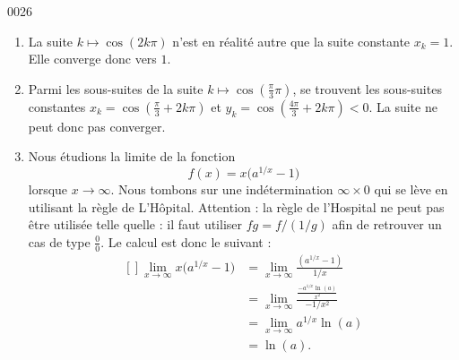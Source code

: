 
\begin{corrige}{0026}

\begin{enumerate}
\item La suite $k\mapsto \cos(2k\pi)$ n'est en réalité autre que la suite constante $x_k=1$. Elle converge donc vers $1$.
\item Parmi les sous-suites de la suite $k\mapsto\cos(\frac{ \pi }{ 3 }\pi)$, se trouvent les sous-suites constantes $x_k=\cos(\frac{ \pi }{ 3 }+2k\pi)$ et $y_k=\cos(\frac{ 4\pi }{ 3 }+2k\pi)<0$. La suite ne peut donc pas converger.
\item Nous étudions la limite de la fonction
\begin{equation}
	f(x)=x\big( a^{1/x}-1 \big)
\end{equation}
lorsque $x\to\infty$. Nous tombons sur une indétermination $\infty\times 0$ qui se lève en utilisant la règle de L'Hôpital. Attention : la règle de l'Hospital ne peut pas être utilisée telle quelle : il faut utiliser $fg=f/(1/g)$ afin de retrouver un cas de type $\frac{ 0 }{ 0 }$. Le calcul est donc le suivant :
\begin{equation}
	\begin{aligned}[]
		\lim_{x\to\infty} x\big( a^{1/x}-1 \big)	&=\lim_{x\to\infty}\frac{ (a^{1/x}-1) }{ 1/x }\\
				&=\lim_{x\to\infty}\frac{ \frac{ -a^{1/x}\ln(a) }{ x^2 } }{ -1/x^2 }\\
				&=\lim_{x\to\infty}a^{1/x}\ln(a)\\
				&=\ln(a).
	\end{aligned}
\end{equation}

\end{enumerate}


\end{corrige}
